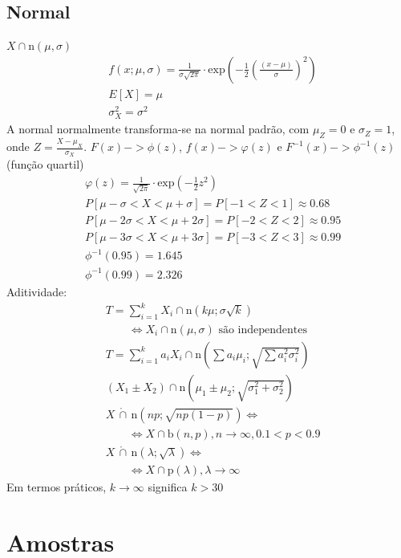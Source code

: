 \documentclass[a4paper]{article}
\newcommand{\aproxcap}{\, \mathring{\cap} \,}
\begin{document}
\begin{multicols}{3}
\subsection{Normal}
$X \cap \text{n}(\mu, \sigma)$
\begin{align*}
  &f(x; \mu, \sigma) = \frac{1}{\sigma\sqrt{2\pi}} \cdot \text{exp}\left(-\frac{1}{2}\left(\frac{(x - \mu)}{\sigma}\right)^2\right) \\
  &E[X] = \mu \\
  &\sigma^2_X = \sigma^2
\end{align*}
A normal normalmente transforma-se na normal padrão, com $\mu_Z = 0$ e $\sigma_Z = 1$, onde $Z = \frac{X - \mu_X}{\sigma_X}$.
$F(x) -> \phi(z)$, $ f(x) -> \varphi(z)$ e $F^{-1}(x) -> \phi^{-1}(z)$ (função quartil)
\begin{align*}
  &\varphi(z) = \frac{1}{\sqrt{2\pi}} \cdot \text{exp}\left(-\frac{1}{2}z^2\right) \\
  &P[\mu - \sigma < X < \mu + \sigma] = P[-1 < Z < 1] \approx 0.68 \\
  &P[\mu - 2\sigma < X < \mu + 2\sigma] = P[-2 < Z < 2] \approx 0.95 \\
  &P[\mu - 3\sigma < X < \mu + 3\sigma] = P[-3 < Z < 3] \approx 0.99 \\
  &\phi^{-1}(0.95) = 1.645 \\
  &\phi^{-1}(0.99) = 2.326 %
\end{align*}
Aditividade:
\begin{align*}
  & T = \sum^k_{i=1} X_i \cap \text{n}\left(k \mu; \sigma \sqrt{k}\right) \\ & \qquad \iff X_i \cap \text{n}(\mu, \sigma) \text{ são independentes}\\
  & T = \sum^k_{i=1} a_i X_i \cap \text{n}\left(\sum a_i \mu_i; \sqrt{\sum a_i^2 \sigma_i^2}\right) \\
  & \left(X_1 \pm X_2\right) \cap \text{n}\left(\mu_1 \pm \mu_2; \sqrt{\sigma_1^2 + \sigma_2^2}\right) \\
  & X \aproxcap \text{n}(n p; \sqrt{np(1 - p)}) \iff \\ 
    &\qquad \iff X \cap \text{b}(n, p), n \to \infty, 0.1 < p < 0.9 \\
  & X \aproxcap \text{n}(\lambda; \sqrt{\lambda}) \iff \\ 
  &\qquad \iff X \cap \text{p}(\lambda), \lambda \to \infty
\end{align*}
Em termos práticos, $k \to \infty$ significa $k > 30$
\section{Amostras}

\end{multicols}
\end{document}
